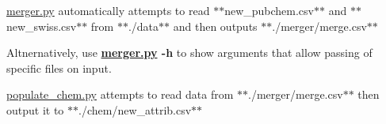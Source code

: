 \mbox{\hyperlink{merger_8py}{merger.\+py}} automatically attempts to read $\ast$$\ast$\textquotesingle{}new\+\_\+pubchem.\+csv\textquotesingle{}$\ast$$\ast$ and $\ast$$\ast$\textquotesingle{}new\+\_\+swiss.\+csv\textquotesingle{}$\ast$$\ast$ from $\ast$$\ast$./data$\ast$$\ast$ and then outputs $\ast$$\ast$./merger/merge.csv$\ast$$\ast$

Altnernatively, use {\bfseries{\mbox{\hyperlink{merger_8py}{merger.\+py}} -\/h}} to show arguments that allow passing of specific files on input.

 \mbox{\hyperlink{populate__chem_8py}{populate\+\_\+chem.\+py}} attempts to read data from $\ast$$\ast$./merger/merge.csv$\ast$$\ast$ then output it to $\ast$$\ast$./chem/new\+\_\+attrib.csv$\ast$$\ast$ 